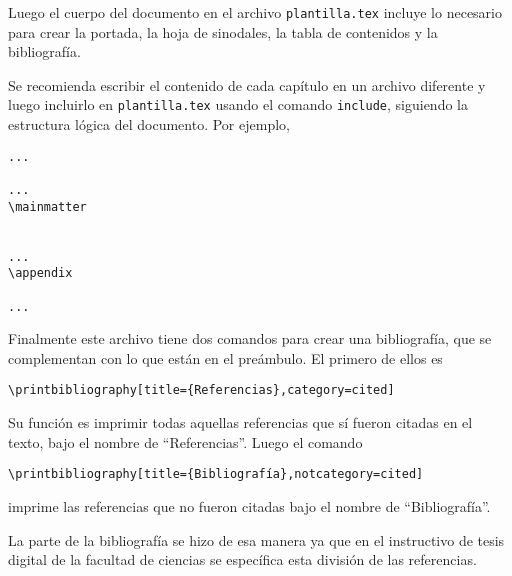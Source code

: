 Luego el cuerpo del documento en el archivo \texttt{plantilla.tex} incluye lo 
necesario para crear la portada, la hoja de sinodales, la tabla de contenidos y 
la bibliografía.

Se recomienda escribir el contenido de cada capítulo en un archivo diferente y 
luego incluirlo en \texttt{plantilla.tex} usando el comando \texttt{include}, 
siguiendo la estructura lógica del documento. Por ejemplo,
\begin{verbatim}
...

...
\mainmatter


...
\appendix

...

\end{verbatim}

Finalmente este archivo tiene dos comandos para crear una bibliografía, que se 
complementan con lo que están en el preámbulo. El primero de ellos es
\begin{verbatim}
\printbibliography[title={Referencias},category=cited]
\end{verbatim}
Su función es imprimir todas aquellas referencias que sí fueron citadas en el 
texto, bajo el nombre de \enquote{Referencias}. Luego el comando
\begin{verbatim}
\printbibliography[title={Bibliografía},notcategory=cited]
\end{verbatim}
imprime las referencias que no fueron citadas bajo el nombre de 
\enquote{Bibliografía}.

La parte de la bibliografía se hizo de esa manera ya que en el instructivo de 
tesis digital de la facultad de ciencias se específica esta división de las 
referencias.